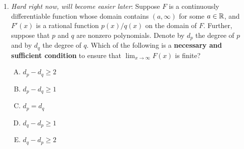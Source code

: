\documentclass[10pt]{amsart}
\begin{document}
\begin{enumerate}
  \begin{enumerate}[(A)]
  \item The sum is always $0$.
  \item The sum equals the leading coefficient of $p$.
  \item The sum is $0$ if $p$ has degree $n - 1$. If the degree of $p$
  is smaller, the sum equals the leading coefficient of $p$.
  \item The sum is $0$ if $p$ has degree smaller than $n - 1$. If $p$
    has degree equal to $n - 1$, the sum is the leading coefficient of
    $p$.
  \item The sum is $0$ if $p$ is a constant polynomial. Otherwise, it
    equals the leading coefficient of $p$.
  \end{enumerate}

  {\em Answer}: Option (D)

  {\em Explanation}: If we take a common denominator and simplify the
  right side, we see that the coefficient of $x^{n-1}$ on the
  numerator of the right side is $\sum_{i=1}^n c_i$. Equating
  coefficients, we obtain that the coefficient of $x^{n-1}$ on the
  left side is also $\sum_{i=1}^n c_i$. If $p$ has degree less than $n
  - 1$, the coefficient on the left side is $0$, so $\sum_{i=1}^n c_i
  = 0$. If $p$ has degree equal to $n - 1$, the coefficient on the
  left side is the leading coefficient of $p$.

  {\em Performance review}: $2$ out of $11$ got this. $8$ chose (E)
  (which is pretty close) and $1$ chose (B).

  {\em Historical note (last year)}: $12$ out of $27$ people got this
  correct. $7$ people chose (E), $3$ people each chose (B) and (C),
  $1$ person chose (A).

  When the denominator is quadratic, then options (D) and (E) are
  euqivalent. This is what might have led to many people choosing
  option (E).

\item {\em Hard right now, will become easier later}: Suppose $F$ is a
  continuously differentiable function whose domain contains
  $(a,\infty)$ for some $a \in \mathbb{R}$, and $F'(x)$ is a rational function
  $p(x)/q(x)$ on the domain of $F$. Further, suppose that $p$ and $q$
  are nonzero polynomials. Denote by $d_p$ the degree of $p$ and by
  $d_q$ the degree of $q$. Which of the following is a {\bf necessary
  and sufficient condition} to ensure that $\lim_{x \to \infty} F(x)$
  is finite?

  \begin{enumerate}[(A)]
  \item $d_p - d_q \ge 2$
  \item $d_p - d_q \ge 1$
  \item $d_p = d_q$
  \item $d_q - d_p \ge 1$
  \item $d_q - d_p \ge 2$
  \end{enumerate}


\end{enumerate}
\end{document}
